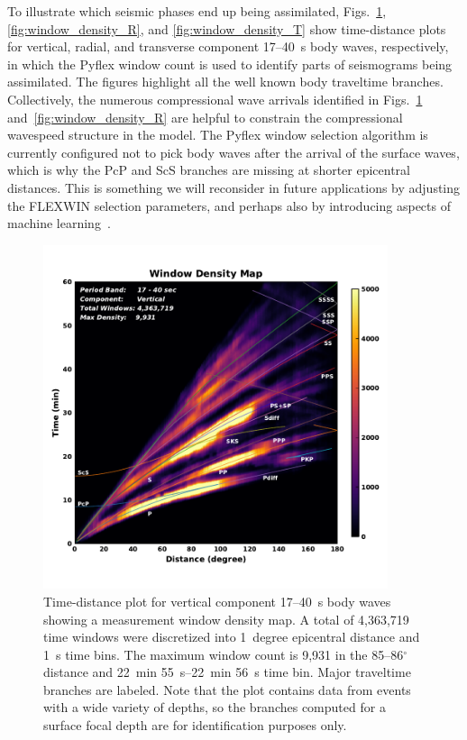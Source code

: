 \documentclass[extra,mreferee]{gji}
\begin{document}
To illustrate which seismic phases end up being assimilated,
Figs.~\ref{fig:window_density_Z}, \ref{fig:window_density_R}, and \ref{fig:window_density_T} show time-distance plots
for vertical, radial, and transverse component 17--40~s body waves,
respectively,
in which the Pyflex window count is used to identify parts of seismograms being assimilated.
The figures highlight all the well known body traveltime branches.
Collectively, the numerous compressional wave arrivals identified in Figs.~\ref{fig:window_density_Z} and~\ref{fig:window_density_R} are helpful to constrain the compressional wavespeed structure in the model.
The Pyflex window selection algorithm is currently configured not to pick body waves after the arrival of the surface waves, which is why the PcP and ScS branches are missing at shorter epicentral distances.
This is something we will reconsider in future applications by adjusting the FLEXWIN selection parameters, and perhaps also by introducing aspects of machine learning~\citep{chen2017}. 

\begin{figure}
  \centering
  \includegraphics[width=0.9\textwidth]{figures/window_colorbar_linear_Z.pdf}
  \caption{\small{Time-distance plot for vertical component 17--40~s body waves showing a measurement window density map.
  A total of 4,363,719 time windows were discretized into 1~degree epicentral distance and 1~s time bins.
  The maximum window count is 9,931 in the 85--86$^\circ$ distance and 22~min 55~s--22~min 56~s time bin.
  Major traveltime branches are labeled. Note that the plot contains data from events with a wide variety of depths, so the branches computed for a surface focal depth are for identification purposes only.
  }}
  \label{fig:window_density_Z}
\end{figure}
\end{document}
